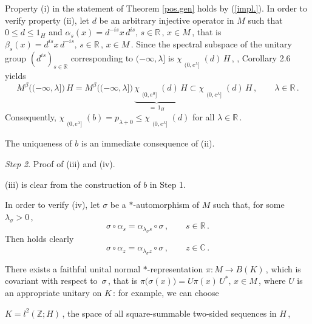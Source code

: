 \documentclass[reqno]{amsart}
\theoremstyle{definition}
\theoremstyle{remark}
\numberwithin{equation}{section}
\theoremstyle{plain}
\begin{document}
Property (i) in the statement of Theorem \ref{pos.gen} holds by
(\ref{impl.}). In order to verify property (ii), let $d$ be
an arbitrary injective operator in $M$ such that $0\leq d\leq 1_H$
and $\alpha_s (x)=d^{-i s} x\, d^{i s} ,\, s\in\mathbb R\, ,\,
x\in M\,$, that is $\beta_s (x)=d^{i s} x\, d^{-i s} ,\, s\in
\mathbb R\, ,\, x\in M\,$. Since the spectral subspace of the
unitary group $(d^{i s})_{s\in\mathbb R}$ corresponding to
$(-\infty ,\lambda ]$ is
$\chi_{\substack{{}\\{(0,e^\lambda ]}}} (d)\, H\,$, \cite{Z2},
Corollary 2.6 yields
\begin{equation*}
M^\beta\big( (-\infty ,\lambda ]\big)\, H =
M^\beta\big( (-\infty ,\lambda ]\big)\,
\underbrace{\chi_{\substack{{}\\{(0,e^0 ]}}} (d)}_{=\, 1_H}\, H
\subset\chi_{\substack{{}\\{(0,e^\lambda ]}}} (d)\, H\, ,\qquad
\lambda\in\mathbb R\, .
\end{equation*}
Consequently, $\chi_{\substack{{}\\{(0,e^\lambda ]}}} (b) =
p_{\lambda +0}\leq\chi_{\substack{{}\\{(0,e^\lambda ]}}} (d)$
for all $\lambda\in\mathbb R\,$.

The uniqueness of $b$ is an immediate consequence of (ii).
\medskip

{\it Step 2}. {\sc Proof of {\rm (iii)} and {\rm (iv)}.}
\medskip

(iii) is clear from the construction of $b$ in Step 1.

In order to verify (iv), let $\sigma$ be a $*$-automorphism of
$M$ such that, for some $\lambda_\sigma >0\,$,
\begin{equation*}
\sigma\circ\alpha_s =\alpha_{\lambda_\sigma s}\circ\sigma\, ,
\qquad s\in\mathbb R\, .
\end{equation*}
Then holds clearly
\begin{equation}\label{intertw.}
\sigma\circ\alpha_z =\alpha_{\lambda_\sigma z}\circ\sigma
\, ,\qquad z\in\mathbb C\, .
\end{equation}

There exists a faithful unital normal $*$-representation
$\pi : M\longrightarrow B(K)\,$, which is covariant with respect
to $\,\sigma\,$, that is $\pi\big( \sigma (x)\big) =
U \pi (x)\, U^* ,\, x\in M\,$, where $U$ is an appropriate
unitary on $K\,$: for example, we can choose
\smallskip

\noindent \hspace{0.25 in} $K=l^2(\mathbb Z ; H)\,$, the space
of all square-summable two-sided sequences in $H\,$,
\smallskip
\end{document}
